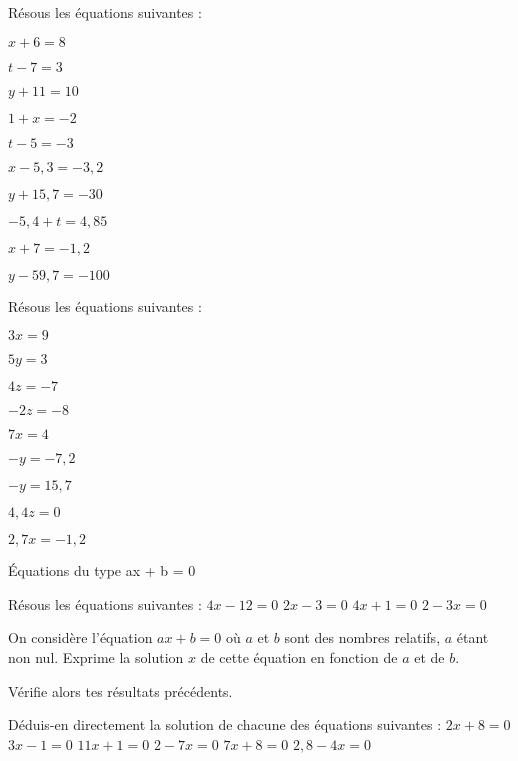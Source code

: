 \begin{exercice}[Équations du type $x + a = b$]

Résous les équations suivantes :

\begin{colenumerate}{2} 
\item $x + 6 = 8$
\item $t -7 = 3$
\item $y + 11 = 10$
\item $1 + x = -2$
\item $t -5 = -3$
\item $x -5,3 = -3,2$
\item $y + 15,7 = -30$
\item $-5,4 + t = 4,85$
\item $x + 7 = -1,2$
\item $y -59,7 = -100$
\end{colenumerate} 
 
\end{exercice}

\begin{exercice}[Équations du type $ax = b$]

Résous les équations suivantes :

\begin{colenumerate}{2} 
\item $3x = 9$
\item $5y = 3$
\item $4z = -7$
\item $-2z = -8$
\item $7x = 4$
\item $-y = -7,2$
\item $-y = 15,7$
\item $4,4z = 0$
\item $2,7x = -1,2$
\end{colenumerate} 
\end{exercice}

\begin{exercice}[]Équations du type ax + b = 0

\begin{colenumerate}{1} 
\item Résous les équations suivantes :
    \subitem $4x -12 = 0$
    \subitem $2x -3 = 0$
    \subitem $4x + 1 = 0$
    \subitem $2 -3x = 0$
\item On considère l'équation $ax + b = 0$ où $a$ et $b$ sont des nombres relatifs, $a$ étant non nul. Exprime la solution $x$ de cette équation en fonction de $a$ et de $b$.

Vérifie alors tes résultats précédents.

\item Déduis-en directement la solution de chacune des équations suivantes : 
    \subitem $2x + 8 = 0$
    \subitem $3x -1 = 0$
    \subitem $11x + 1 = 0$
    \subitem $2 -7x = 0$
    \subitem $7x + 8 = 0$
    \subitem $2,8 -4x = 0$
\end{colenumerate} 
\end{exercice}




